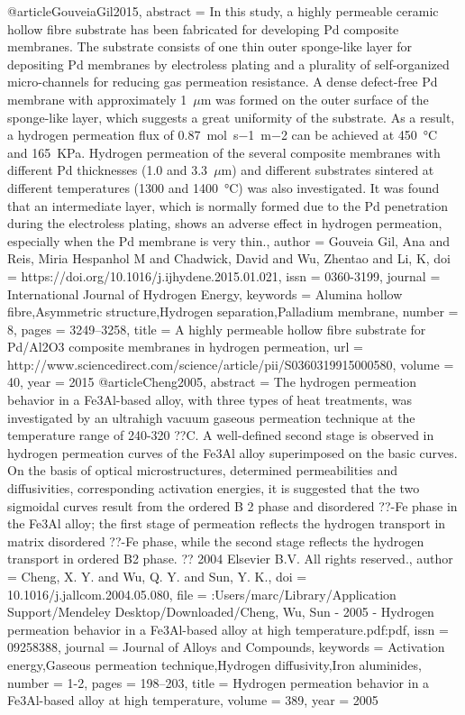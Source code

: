 @article{GouveiaGil2015,
abstract = {In this study, a highly permeable ceramic hollow fibre substrate has been fabricated for developing Pd composite membranes. The substrate consists of one thin outer sponge-like layer for depositing Pd membranes by electroless plating and a plurality of self-organized micro-channels for reducing gas permeation resistance. A dense defect-free Pd membrane with approximately 1 $\mu$m was formed on the outer surface of the sponge-like layer, which suggests a great uniformity of the substrate. As a result, a hydrogen permeation flux of 0.87 mol s−1 m−2 can be achieved at 450 °C and 165 KPa. Hydrogen permeation of the several composite membranes with different Pd thicknesses (1.0 and 3.3 $\mu$m) and different substrates sintered at different temperatures (1300 and 1400 °C) was also investigated. It was found that an intermediate layer, which is normally formed due to the Pd penetration during the electroless plating, shows an adverse effect in hydrogen permeation, especially when the Pd membrane is very thin.},
author = {{Gouveia Gil}, Ana and Reis, Miria Hespanhol M and Chadwick, David and Wu, Zhentao and Li, K},
doi = {https://doi.org/10.1016/j.ijhydene.2015.01.021},
issn = {0360-3199},
journal = {International Journal of Hydrogen Energy},
keywords = {Alumina hollow fibre,Asymmetric structure,Hydrogen separation,Palladium membrane},
number = {8},
pages = {3249--3258},
title = {{A highly permeable hollow fibre substrate for Pd/Al2O3 composite membranes in hydrogen permeation}},
url = {http://www.sciencedirect.com/science/article/pii/S0360319915000580},
volume = {40},
year = {2015}
}
@article{Cheng2005,
abstract = {The hydrogen permeation behavior in a Fe3Al-based alloy, with three types of heat treatments, was investigated by an ultrahigh vacuum gaseous permeation technique at the temperature range of 240-320 ??C. A well-defined second stage is observed in hydrogen permeation curves of the Fe3Al alloy superimposed on the basic curves. On the basis of optical microstructures, determined permeabilities and diffusivities, corresponding activation energies, it is suggested that the two sigmoidal curves result from the ordered B 2 phase and disordered ??-Fe phase in the Fe3Al alloy; the first stage of permeation reflects the hydrogen transport in matrix disordered ??-Fe phase, while the second stage reflects the hydrogen transport in ordered B2 phase. ?? 2004 Elsevier B.V. All rights reserved.},
author = {Cheng, X. Y. and Wu, Q. Y. and Sun, Y. K.},
doi = {10.1016/j.jallcom.2004.05.080},
file = {:Users/marc/Library/Application Support/Mendeley Desktop/Downloaded/Cheng, Wu, Sun - 2005 - Hydrogen permeation behavior in a Fe3Al-based alloy at high temperature.pdf:pdf},
issn = {09258388},
journal = {Journal of Alloys and Compounds},
keywords = {Activation energy,Gaseous permeation technique,Hydrogen diffusivity,Iron aluminides},
number = {1-2},
pages = {198--203},
title = {{Hydrogen permeation behavior in a Fe3Al-based alloy at high temperature}},
volume = {389},
year = {2005}
}
